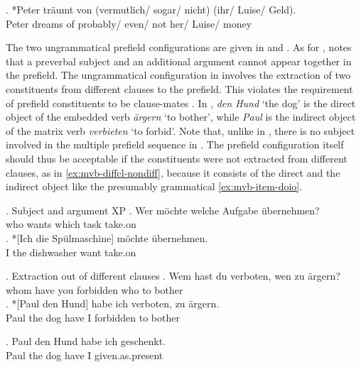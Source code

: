 \exg. *Peter träumt von (vermutlich/ sogar/ nicht) (ihr/ Luise/ Geld).\\  
 Peter dreams of probably/ even/ not her/ Luise/ money\\
\label{ex:muller-jacobs}

The two ungrammatical prefield configurations are given in \Next and \NNext. As for \Next, \citet[59]{muller2003} notes that a preverbal subject and an additional argument cannot appear together in the prefield. The ungrammatical configuration in \NNext involves the extraction of two constituents from different clauses to the prefield. This violates the requirement of prefield constituents to be clause-mates \citep{fanselow1993}. In \NNext, \textit{den Hund} `the dog' is the direct object of the embedded verb \textit{ärgern} `to bother', while \textit{Paul} is the indirect object of the matrix verb \textit{verbieten} `to forbid'. Note that, unlike in \Next, there is no subject involved in the multiple prefield sequence in \NNext. The prefield configuration itself should thus be acceptable if the constituents were not extracted from different clauses, as in \ref{ex:mvb-diffcl-nondiff}, because it consists of the direct and the indirect object like the presumably grammatical \ref{ex:mvb-item-doio}.

\ex. Subject and argument XP \label{ex:mvb-item-subjxp}
\ag. Wer möchte welche Aufgabe übernehmen? \\
    who wants   which   task        take.on\\
	\bg. *[Ich die Spülmaschine] möchte übernehmen.\\
   I  the dishwasher   want     take.on \\
	
\ex. Extraction out of different clauses \label{ex:mvb-item-diffcl}
\ag. Wem   hast  du   verboten, wen zu ärgern?\\
    whom  have you forbidden who to  bother\\
	\bg. *[Paul den Hund] habe  ich verboten, zu ärgern.\\
     Paul   the  dog     have  I     forbidden to bother\\
	
\exg. Paul den Hund habe ich geschenkt. \label{ex:mvb-diffcl-nondiff}\\
    Paul the  dog    have I    given.as.present\\

